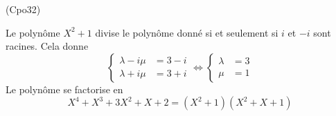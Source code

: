 \begin{tiny}(Cpo32)\end{tiny} Le polynôme $X^2+1$ divise le polynôme donné si et seulement si $i$ et $-i$ sont racines. Cela donne
\begin{displaymath}
 \left\lbrace 
\begin{aligned}
 \lambda - i \mu &=3-i \\  \lambda + i \mu &=3+i  
\end{aligned}\right. 
\Leftrightarrow 
\left\lbrace 
\begin{aligned}
 \lambda&=3 \\ \mu &=1
\end{aligned}\right. 
\end{displaymath}
Le polynôme se factorise en
\begin{displaymath}
 X^4+X^3+3X^2+X+2=(X^2+1)(X^2+X+1)
\end{displaymath}
